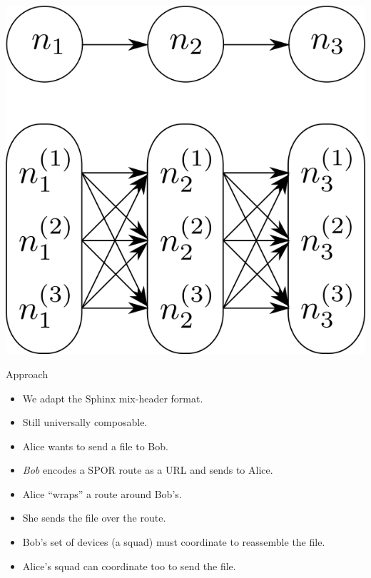\begin{frame}
  \begin{center}
    \includegraphics[height=0.5\textheight]{fig/principle-SPOR.png}
  \end{center}

  \pause

  \begin{block}{Approach}
    \begin{itemize}
      \item We adapt the Sphinx mix-header format.
      \item Still universally composable.
    \end{itemize}
  \end{block}
\end{frame}

\begin{frame}
  \begin{example}[Scenario]
    \begin{itemize}
      \item Alice wants to send a file to Bob.
      \item \emph{Bob} encodes a SPOR route as a URL and sends to Alice.
      \item Alice \enquote{wraps} a route around Bob's.
      \item She sends the file over the route.
    \end{itemize}
  \end{example}

  \pause

  \begin{remark}
    \begin{itemize}
      \item Bob's set of devices (a squad) must coordinate to reassemble the 
        file.
      \item Alice's squad can coordinate too to send the file.
    \end{itemize}
  \end{remark}
\end{frame}

